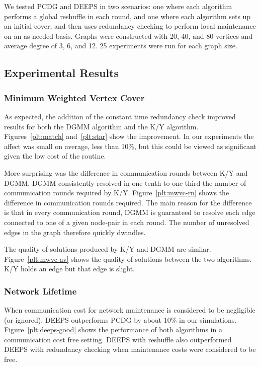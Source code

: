 \documentclass[technote, 10pt, letter]{IEEEtran}
\begin{document}
We tested PCDG and DEEPS in two scenarios: one where each algorithm performs a global reshuffle in each round, and one where each algorithm sets up an initial cover, and then uses redundancy checking to perform local maintenance on an as needed basis. Graphs were constructed with 20, 40, and 80 vertices and average degree of 3, 6, and 12. 25 experiments were run for each graph size.
 
\subsection{Experimental Results}
\label{sub:exp-results}
\subsubsection{Minimum Weighted Vertex Cover}
\label{sub:mwvc-results}
As expected, the addition of the constant time redundancy check improved results for both the DGMM algorithm and the K/Y algorithm. Figures~\ref{plt:match} and~\ref{plt:star} show the improvement. In our experiments the affect was small on average, less than 10\%, but this could be viewed as significant given the low cost of the routine. 


More surprising was the difference in communication rounds between K/Y and DGMM. DGMM consistently resolved in one-tenth to one-third the number of communication rounds required by K/Y. Figure~\ref{plt:mwvc-rn} shows the difference in communication rounds required. The main reason for the difference is that in every communication round, DGMM is guaranteed to resolve each edge connected to one of a given node-pair in each round. The number of unresolved edges in the graph therefore quickly dwindles.


The quality of solutions produced by K/Y and DGMM are similar. Figure~\ref{plt:mwvc-av} shows the quality of solutions between the two algorithms. K/Y holds an edge but that edge is slight.
  


\subsubsection{Network Lifetime}
\label{sub:netlife-results}
When communication cost for network maintenance is considered to be negligible (or ignored), DEEPS outperforms PCDG by about 10\% in our simulations. Figure~\ref{plt:deeps-good} shows the performance of both algorithms in a communication cost free setting. DEEPS with reshuffle also outperformed DEEPS with redundancy checking when maintenance costs were considered to be free.

\end{document}
